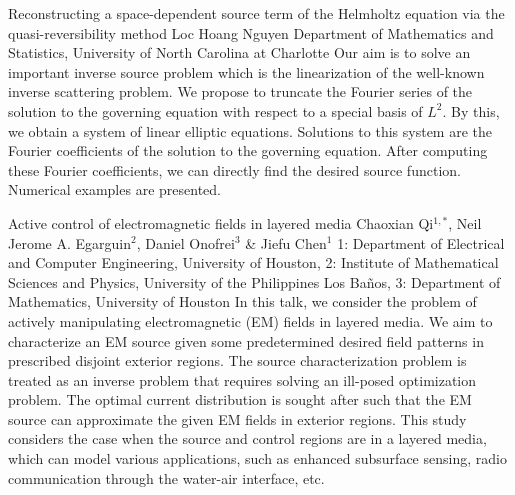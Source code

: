 \begin{addmargin}[2em]{0em}
\vspace{1.5ex}
\abs
{Reconstructing a space-dependent source term of the Helmholtz equation via the quasi-reversibility method}
{Loc Hoang Nguyen}
{Department of Mathematics and Statistics, University of North Carolina at Charlotte}
{Our aim is to solve an important inverse source problem which is the linearization of the well-known inverse scattering problem. We propose to truncate the Fourier series of the solution to the governing equation with respect to a special basis of $L^2$. By this, we obtain a system of linear elliptic equations. Solutions to this system are the Fourier coefficients of the solution to the governing equation. After computing these Fourier coefficients, we can directly find the desired source function. Numerical examples are presented.}


\vspace{1.5ex}
\abs
{Active control of electromagnetic fields in layered media}
{Chaoxian Qi$^{1,*}$, Neil Jerome A. Egarguin$^2$, Daniel Onofrei$^3$ \& Jiefu Chen$^1$}
{1: Department of Electrical and Computer Engineering, University of Houston, 2: Institute of Mathematical Sciences and Physics, University of the Philippines Los Ba\~nos, 3: Department of Mathematics, University of Houston}
{In this talk, we consider the problem of actively manipulating electromagnetic (EM) fields in layered media. We aim to characterize an EM source given some predetermined desired field patterns in prescribed disjoint exterior regions. The source characterization problem is treated as an inverse problem that requires solving an ill-posed optimization problem. The optimal current distribution is sought after such that the EM source can approximate the given EM fields in exterior regions. This study considers the case when the source and control regions are in a layered media, which can model various applications, such as enhanced subsurface sensing, radio communication through the water-air interface, etc.}




\end{addmargin}
